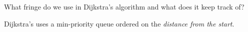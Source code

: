 \question What fringe do we use in Dijkstra's algorithm and what does it keep
track of?

\begin{solution}[0.5in]
Dijkstra's uses a min-priority queue ordered on the \emph{distance from the
start}.
\end{solution}
